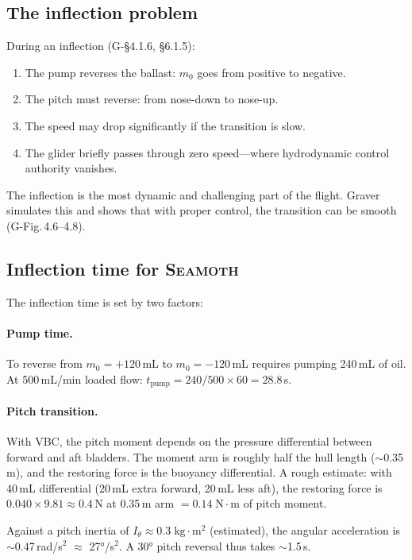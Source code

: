 \documentclass[11pt,a4paper]{article}
\newcommand{\seamoth}{\textsc{Seamoth}}
\begin{document}
\subsection{The inflection problem}

During an inflection (G-\S4.1.6, \S6.1.5):
\begin{enumerate}[nosep]
  \item The pump reverses the ballast: $m_0$ goes from positive to negative.
  \item The pitch must reverse: from nose-down to nose-up.
  \item The speed may drop significantly if the transition is slow.
  \item The glider briefly passes through zero speed---where hydrodynamic control
    authority vanishes.
\end{enumerate}

The inflection is the most dynamic and challenging part of the flight.  Graver
simulates this and shows that with proper control, the transition can be smooth
(G-Fig.\,4.6--4.8).

\subsection{Inflection time for \seamoth{}}

The inflection time is set by two factors:

\paragraph{Pump time.}
To reverse from $m_0=+120$\,mL to $m_0=-120$\,mL requires pumping 240\,mL of oil.
At 500\,mL/min loaded flow: $t_\text{pump} = 240/500\times60 = 28.8$\,s.

\paragraph{Pitch transition.}
With VBC, the pitch moment depends on the pressure differential between forward and aft
bladders.  The moment arm is roughly half the hull length ($\sim$0.35\,m), and the
restoring force is the buoyancy differential.  A rough estimate: with 40\,mL differential
(20\,mL extra forward, 20\,mL less aft), the restoring force is $0.040\times9.81\approx0.4$\,N
at 0.35\,m arm $= 0.14\;\text{N}\cdot\text{m}$ of pitch moment.

Against a pitch inertia of $I_\theta\approx0.3\;\text{kg}\cdot\text{m}^2$ (estimated),
the angular acceleration is $\sim$0.47\,rad/s$^2$ $\approx$ 27°/s$^2$.  A 30° pitch
reversal thus takes $\sim$1.5\,s.
\end{document}
